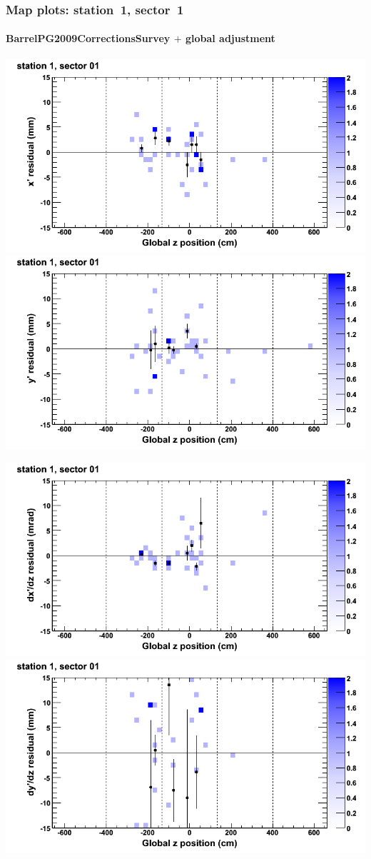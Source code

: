 \documentclass[compress]{beamer}
\begin{document}
\begin{frame}
\frametitle{Map plots: station~1, sector~1}
\framesubtitle{BarrelPG2009CorrectionsSurvey $+$ global adjustment}
\includegraphics[width=0.5\linewidth]{mapplots_re01/DTvsz_st1sec01_x.png}
\includegraphics[width=0.5\linewidth]{mapplots_re01/DTvsz_st1sec01_y.png}

\includegraphics[width=0.5\linewidth]{mapplots_re01/DTvsz_st1sec01_dxdz.png}
\includegraphics[width=0.5\linewidth]{mapplots_re01/DTvsz_st1sec01_dydz.png}
\end{frame}
\end{document}
